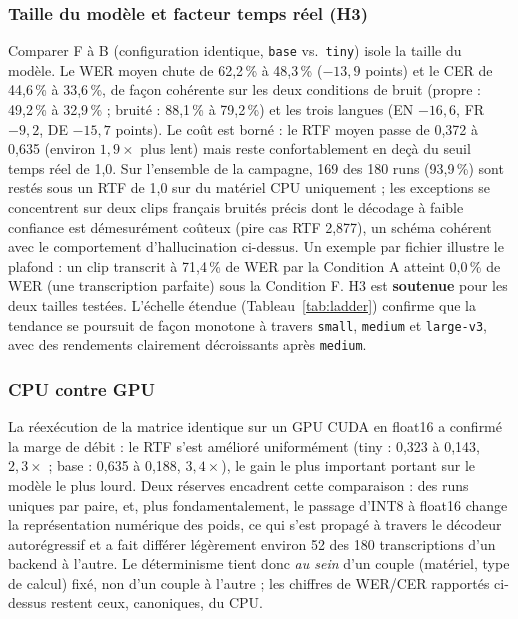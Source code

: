 \documentclass[12pt]{report}
\begin{document}
\subsubsection{Taille du modèle et facteur temps réel (H3)}
Comparer F à B (configuration identique, \texttt{base} vs.\ \texttt{tiny}) isole la taille du modèle. Le WER moyen chute de 62,2\,\% à 48,3\,\% ($-13{,}9$ points) et le CER de 44,6\,\% à 33,6\,\%, de façon cohérente sur les deux conditions de bruit (propre : 49,2\,\% à 32,9\,\% ; bruité : 88,1\,\% à 79,2\,\%) et les trois langues (EN $-16{,}6$, FR $-9{,}2$, DE $-15{,}7$ points). Le coût est borné : le RTF moyen passe de 0,372 à 0,635 (environ $1{,}9\times$ plus lent) mais reste confortablement en deçà du seuil temps réel de 1,0. Sur l'ensemble de la campagne, 169 des 180 runs (93,9\,\%) sont restés sous un RTF de 1,0 sur du matériel CPU uniquement ; les exceptions se concentrent sur deux clips français bruités précis dont le décodage à faible confiance est démesurément coûteux (pire cas RTF 2,877), un schéma cohérent avec le comportement d'hallucination ci-dessus. Un exemple par fichier illustre le plafond : un clip transcrit à 71,4\,\% de WER par la Condition A atteint 0,0\,\% de WER (une transcription parfaite) sous la Condition F. H3 est \textbf{soutenue} pour les deux tailles testées. L'échelle étendue (Tableau~\ref{tab:ladder}) confirme que la tendance se poursuit de façon monotone à travers \texttt{small}, \texttt{medium} et \texttt{large-v3}, avec des rendements clairement décroissants après \texttt{medium}.
\subsubsection{CPU contre GPU}
La réexécution de la matrice identique sur un GPU CUDA en float16 a confirmé la marge de débit : le RTF s'est amélioré uniformément (tiny : 0,323 à 0,143, $2{,}3\times$ ; base : 0,635 à 0,188, $3{,}4\times$), le gain le plus important portant sur le modèle le plus lourd. Deux réserves encadrent cette comparaison : des runs uniques par paire, et, plus fondamentalement, le passage d'INT8 à float16 change la représentation numérique des poids, ce qui s'est propagé à travers le décodeur autorégressif et a fait différer légèrement environ 52 des 180 transcriptions d'un backend à l'autre. Le déterminisme tient donc \emph{au sein} d'un couple (matériel, type de calcul) fixé, non d'un couple à l'autre ; les chiffres de WER/CER rapportés ci-dessus restent ceux, canoniques, du CPU.
\end{document}
